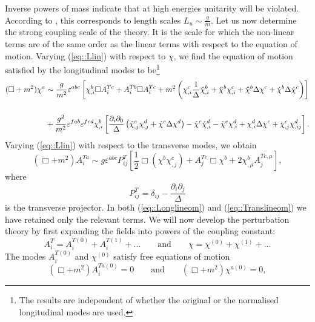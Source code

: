 \documentclass{article}
\begin{document}
Inverse powers of mass indicate that at high energies unitarity will be violated. According to \cite{Vainshtein}, this corresponds to length scales $L_u\sim\frac{g}{m}$. Let us now determine the strong coupling scale of the theory. It is the scale for which the non-linear terms are of the same order as the linear terms with respect to the equation of motion. Varying (\ref{eq::Llin}) with respect to $\chi$, we find the equation of motion satisfied by the longitudinal modes to be\footnote{The results are independent of whether the original or the normalised longitudinal modes are used.}
\begin{equation}\label{eq::Longlineom}
    \begin{split}
        (\Box+m^2)\chi^a&\sim\frac{g}{m^2}\varepsilon^{abc}\left[\chi^b_{,i}\Box A_i^{Tc}+A_i^{Tb}\Box A_i^{Tc}+m^2\left(\chi^c_{,i}\frac{1}{\Delta}\Ddot{\chi}^b_{,i}+\Ddot{\chi}^b\chi^c_{,i}+\Ddot{\chi}^b\Delta\chi^c+\dot{\chi}^b\Delta\dot{\chi}^c\right)\right]\\\\
        &+\frac{g^2}{m^2}\varepsilon^{fab}\varepsilon^{fcd}\chi^b_{,i}\left[\frac{\partial_i\partial_0}{\Delta}\left(\dot{\chi}^c_{,j}\chi^d_{,j}+\dot{\chi}^c\Delta\chi^d\right)-\dot{\chi}^c\dot{\chi}^d_{,i}-\Ddot{\chi}^c\chi^d_{,i}+\chi^d_{,i}\Delta\chi^c+\chi^c_{,j}\chi^d_{,ij}\right].
    \end{split}
\end{equation}
Varying (\ref{eq::Llin}) with respect to the transverse modes, we obtain 
\begin{equation}\label{eq::Translineom}
    (\Box+m^2)A_i^{Ta}\sim g\varepsilon^{abc}P_{ij}^T\left[\frac{1}{2}\Box\left(\chi^b\chi^c_{,j}\right)+A_j^{Tc}\Box\chi^b+2\chi^b_{,\mu}A_j^{Tc,\mu}\right],
\end{equation}
where 
\begin{equation}
    P_{ij}^T=\delta_{ij}-\frac{\partial_i\partial_j}{\Delta}
\end{equation}
is the transverse projector. In both (\ref{eq::Longlineom}) and (\ref{eq::Translineom}) we have retained only the relevant terms. We will now develop the perturbation theory by first expanding the fields into powers of the coupling constant: 
\begin{equation}
    A_i^T=A_i^{T(0)}+A_i^{T(1)}+...\qquad\text{and}\qquad \chi=\chi^{(0)}+\chi^{(1)}+...
\end{equation}
The modes $A_i^{T(0)}$ and $\chi^{(0)}$ satisfy free equations of motion
\begin{equation}
    (\Box+m^2)A_i^{Ta(0)}=0\qquad\text{and}\qquad (\Box+m^2)\chi^{a(0)}=0,
\end{equation}
\end{document}
